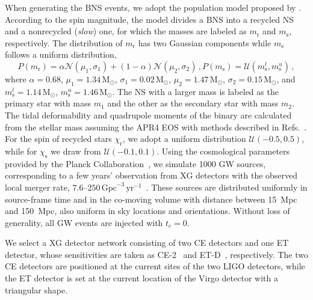 \documentclass[a4paper,11pt]{article}
\begin{document}
When generating the BNS events, we adopt the population model proposed by
\citet{Farrow:2019xnc}.  According to the spin magnitude, the model divides a
BNS into a recycled NS and a nonrecycled (\emph{slow}) one, for which the masses
are labeled as $m_{\mathrm{r}}$ and $m_{\mathrm{s}}$, respectively.  The
distribution of $m_{\mathrm{r}}$ has two Gaussian components while
$m_{\mathrm{s}}$ follows a uniform distribution,
\begin{subequations}
\label{mass population}
\begin{equation}
    P(m_{\mathrm{r}}) = \alpha \mathcal{N}(\mu_1, \sigma_1) + (1-\alpha)
    \mathcal{N}(\mu_2, \sigma_2)\,,
\end{equation}
\begin{equation}
    P(m_{\mathrm{s}}) = \mathcal{U}(m_{\mathrm{s}}^l, m_{\mathrm{s}}^u)\,,
\end{equation}
\end{subequations}
where $\alpha=0.68$, $\mu_1=1.34\, \mathrm{M}_{\odot}$, $\sigma_1=0.02\,
\mathrm{M}_ {\odot}$, $\mu_2=1.47\, \mathrm{M}_{\odot}$, $\sigma_2=0.15\,
\mathrm{M}_{\odot}$, and $m_{\mathrm{s}}^l =1.14\, \mathrm{M}_{\odot}$,
$m_{\mathrm{s}}^u =1.46\, \mathrm{M}_{\odot}$. The NS with a larger mass is
labeled as the primary star with mass $m_1$ and the other as the secondary star
with mass $m_2$.  The tidal deformability and quadrupole moments of the binary
are calculated from the stellar mass assuming the APR4 EOS with methods
described in Refs.~\cite{Yagi:2013awa, Atta:2024ckt}.  For the spin of recycled
stars $\chi_{\mathrm{r}}$, we adopt a uniform distribution
$\mathcal{U}(-0.5,0.5)$, while for $\chi_{\mathrm{s}}$ we draw from
$\mathcal{U}(-0.1,0.1)$.  Using the cosmological parameters provided by the
Planck Collaboration~\cite{Planck:2018vyg}, we simulate 1000 GW sources,
corresponding to a few years' observation from XG detectors with the observed
local merger rate, $7.6$--$250\, \mathrm{Gpc}^{-3} \,
\mathrm{yr}^{-1}$~\cite{LIGOScientific:2025pvj, LIGOScientific:2020aai}.  These
sources are distributed uniformly in source-frame time and in the co-moving
volume with distance between 15~Mpc and 150~Mpc, also uniform in sky locations
and orientations. Without loss of generality, all GW events are injected with
$t_{c}=0$.

We select a XG detector network consisting of two CE detectors and one ET 
detector, whose sensitivities are taken as CE-2~\cite{Reitze:2019iox,
Reitze:2019dyk} and ET-D~\cite{Punturo:2010zz, Hild:2010id,
Sathyaprakash:2012jk}, respectively.  The two CE detectors are positioned at the
current sites of the two LIGO detectors, while the ET detector is set at the
current location of the Virgo detector with a triangular shape. 
\end{document}
